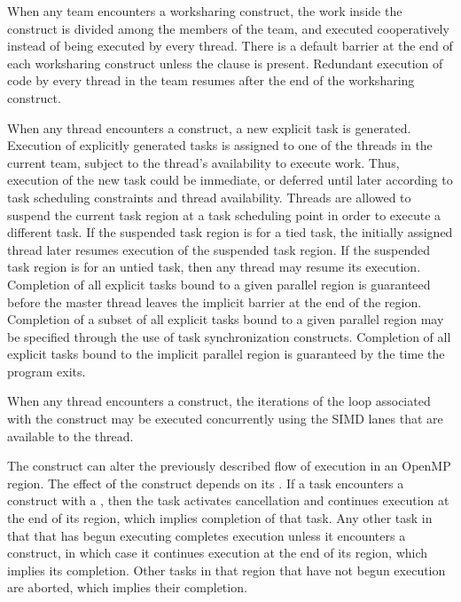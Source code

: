 When any team encounters a worksharing construct, the work inside the construct is 
divided among the members of the team, and executed cooperatively instead of being 
executed by every thread. There is a default barrier at the end of each worksharing 
construct unless the  clause is present. Redundant execution of code by every
thread in the team resumes after the end of the worksharing construct.

When any thread encounters a  construct, a new explicit task is generated.
Execution of explicitly generated tasks is assigned to one of the threads in the current 
team, subject to the thread's availability to execute work. Thus, execution of the new 
task could be immediate, or deferred until later according to task scheduling constraints 
and thread availability. Threads are allowed to suspend the current task region at a task 
scheduling point in order to execute a different task. If the suspended task region is for
a tied task, the initially assigned thread later resumes execution of the suspended task
region. If the suspended task region is for an untied task, then any thread may resume its
execution. Completion of all explicit tasks bound to a given parallel region is guaranteed
before the master thread leaves the implicit barrier at the end of the region. Completion
of a subset of all explicit tasks bound to a given parallel region may be specified through
the use of task synchronization constructs. Completion of all explicit tasks bound to the
implicit parallel region is guaranteed by the time the program exits.

When any thread encounters a  construct, the iterations of the loop associated with
the construct may be executed concurrently using the SIMD lanes that are available to
the thread.

The  construct can alter the previously described flow of execution in an
OpenMP region. The effect of the  construct depends on its 
. If a task encounters a  
construct with a  
, then the task activates cancellation 
and continues execution at the end of its
 region, which implies completion of that task. 
Any other task in that 
that has begun executing completes execution unless it encounters a 
 construct, in which case it continues execution at the end of its  region,
which implies its completion. Other tasks in that  region that have not
begun execution are aborted, which implies their completion.

